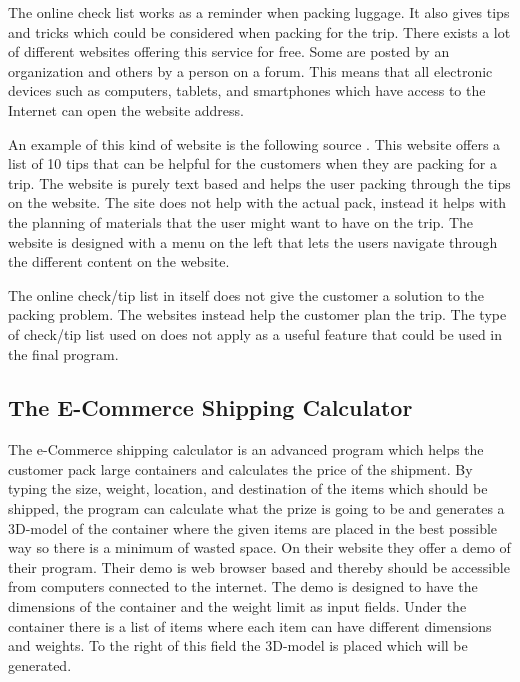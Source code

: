 The online check list works as a reminder when packing luggage. It also gives tips and tricks which could be considered when packing for the trip. There exists a lot of different websites offering this service for free. Some are posted by an organization and others by a person on a forum. This means that all electronic devices such as computers, tablets, and smartphones which have access to the Internet can open the website address.

An example of this kind of website is the following source \citep{onlinecheck}. This website offers a list of 10 tips that can be helpful for the customers when they are packing for a trip. The website is purely text based and helps the user packing through the tips on the website.
The site does not help with the actual pack, instead it helps with the planning of materials that the user might want to have on the trip.
The website is designed with a menu on the left that lets the users navigate through the different content on the website.

The online check/tip list in itself does not give the customer a solution to the packing problem. The websites instead help the customer plan the trip. The type of check/tip list used on \citep{onlinecheck} does not apply as a useful feature that could be used in the final program. %

\subsection{The E-Commerce Shipping Calculator}
\label{ShippingCal}

The e-Commerce shipping calculator is an advanced program which helps the customer pack large containers and calculates the price of the shipment.
By typing the size, weight, location, and destination of the items which should be shipped, the program can calculate what the prize is going to be and generates a 3D-model of the container where the given items are placed in the best possible way so there is a minimum of wasted space. On their website \citep{solvingmaze} they offer a demo of their program. Their demo is web browser based and thereby should be accessible from computers connected to the internet.
The demo is designed to have the dimensions of the container and the weight limit as input fields. Under the container there is a list of items where each item can have different dimensions and weights. To the right of this field the 3D-model is placed which will be generated.

